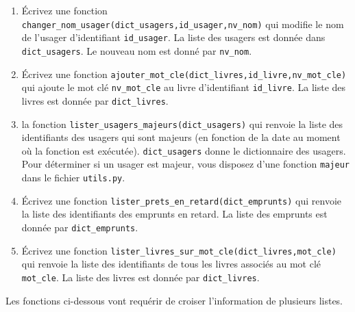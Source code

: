 \documentclass[10pt,a4paper]{sujets-exercices}
\begin{document}
\begin{enumerate}

\item Écrivez une fonction \texttt{changer\_nom\_usager(dict\_usagers,id\_usager,nv\_nom)} qui modifie le nom de l'usager d'identifiant \texttt{id\_usager}. La liste des usagers est donnée dans \texttt{dict\_usagers}. Le nouveau nom est donné par \texttt{nv\_nom}.

\item Écrivez une fonction \texttt{ajouter\_mot\_cle(dict\_livres,id\_livre,nv\_mot\_cle)} qui ajoute le mot clé \texttt{nv\_mot\_cle} au livre d'identifiant \texttt{id\_livre}. La liste des livres est donnée par \texttt{dict\_livres}.

\item la fonction \texttt{lister\_usagers\_majeurs(dict\_usagers)} qui renvoie la liste des identifiants des usagers qui sont majeurs (en fonction de la date au moment où la fonction est exécutée). \texttt{dict\_usagers} donne le dictionnaire des usagers. Pour déterminer si un usager est majeur, vous disposez d'une fonction \texttt{majeur} dans le fichier \texttt{utils.py}.

\item Écrivez une fonction \texttt{lister\_prets\_en\_retard(dict\_emprunts)} qui renvoie la liste des identifiants des emprunts en retard. La liste des emprunts est donnée par \texttt{dict\_emprunts}.

\item Écrivez une fonction \texttt{lister\_livres\_sur\_mot\_cle(dict\_livres,mot\_cle)} qui renvoie la liste des identifiants de tous les livres associés au mot clé \texttt{mot\_cle}. La liste des livres est donnée par \texttt{dict\_livres}.

\end{enumerate}


Les fonctions ci-dessous vont requérir de croiser l'information de plusieurs listes.
\end{document}
